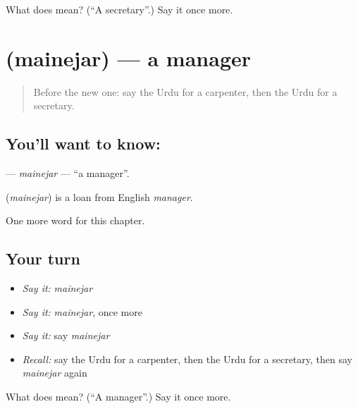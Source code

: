 \begin{tcolorbox}[breakable,colback=teal!4,colframe=teal!35!black,title={Before you move on}]
What does  mean? (\textquotedblleft{}A secretary\textquotedblright{}.) Say it once more.
\end{tcolorbox}
\section[\texorpdfstring{\ur{مینیجر} (mainejar)}{مینیجر (mainejar)}]{ (mainejar) — a manager}

\label{lesson:UR-C211-mainejar}



\begin{quote}
Before the new one: say the Urdu for a carpenter, then the Urdu for a secretary.
\end{quote}

\subsection*{You'll want to know: }
\textbf{} — \emph{mainejar} — \textquotedblleft{}a manager\textquotedblright{}.

\begin{cousinweb}
\textbf{} (\emph{mainejar}) is a loan from English \emph{manager}.
\end{cousinweb}

\begin{grammarlens}[title={What you've built}]
One more word for this chapter.
\end{grammarlens}

\subsection*{Your turn}
\begin{itemize}
\raggedright
  \item \emph{Say it:} \emph{mainejar}
  \item \emph{Say it:} \emph{mainejar}, once more
  \item \emph{Say it:} say \emph{mainejar}
  \item \emph{Recall:} say the Urdu for a carpenter, then the Urdu for a secretary, then say \emph{mainejar} again
\end{itemize}

\begin{tcolorbox}[breakable,colback=teal!4,colframe=teal!35!black,title={Before you move on}]
What does  mean? (\textquotedblleft{}A manager\textquotedblright{}.) Say it once more.
\end{tcolorbox}
